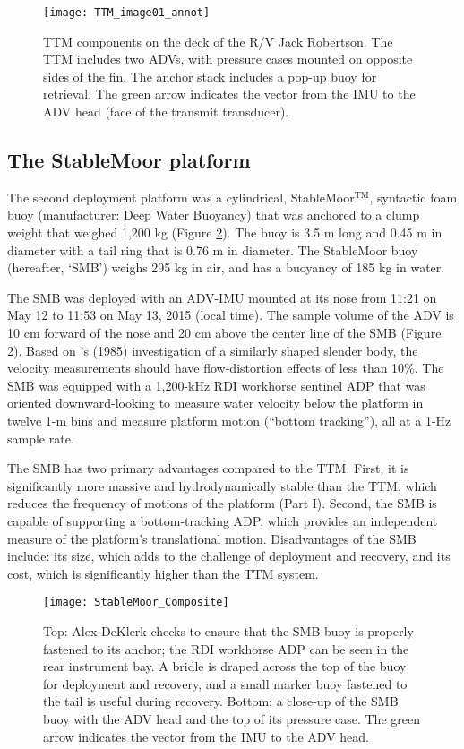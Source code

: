 \begin{figure}[t]
  \centering
  \texttt{[image: TTM\_image01\_annot]}
  \caption{TTM components on the deck of the R/V Jack Robertson. The TTM includes two ADVs, with pressure cases mounted on opposite sides of the fin. The anchor stack includes a pop-up buoy for retrieval. The green arrow indicates the vector from the IMU to the ADV head (face of the transmit transducer). }
  \label{fig:ttm:photo}
\end{figure}

\subsection{The StableMoor platform}

The second deployment platform was a cylindrical, StableMoor$^\mathrm{TM}$, syntactic foam buoy (manufacturer: Deep Water Buoyancy) that was anchored to a clump weight that weighed 1,200 kg (Figure \ref{fig:SM}). The buoy is 3.5 m long and 0.45 m in diameter with a tail ring that is 0.76 m in diameter. The StableMoor buoy (hereafter, `SMB') weighs 295 kg in air, and has a buoyancy of 185 kg in water.

The SMB was deployed with an ADV-IMU mounted at its nose from 11:21 on May 12 to 11:53 on May 13, 2015 (local time). The sample volume of the ADV is 10 cm forward of the nose and 20 cm above the center line of the SMB (Figure \ref{fig:SM}). Based on \citeauthor{Wyngaard++1985}'s (1985) investigation of a similarly shaped slender body, the velocity measurements should have flow-distortion effects of less than 10\%. The SMB was equipped with a 1,200-kHz RDI workhorse sentinel ADP that was oriented downward-looking to measure water velocity below the platform in twelve 1-m bins and measure platform motion (``bottom tracking''), all at a 1-Hz sample rate. 

The SMB has two primary advantages compared to the TTM. First, it is significantly more massive and hydrodynamically stable than the TTM, which reduces the frequency of motions of the platform (Part I). Second, the SMB is capable of supporting a bottom-tracking ADP, which provides an independent measure of the platform's translational motion. Disadvantages of the SMB include: its size, which adds to the challenge of deployment and recovery, and its cost, which is significantly higher than the TTM system.

\begin{figure}[t]
  \centering
  \texttt{[image: StableMoor\_Composite]}
  \caption{Top: Alex DeKlerk checks to ensure that the SMB buoy is properly fastened to its anchor; the RDI workhorse ADP can be seen in the rear instrument bay. A bridle is draped across the top of the buoy for deployment and recovery, and a small marker buoy fastened to the tail is useful during recovery.  Bottom: a close-up of the SMB buoy with the ADV head and the top of its pressure case. The green arrow indicates the vector from the IMU to the ADV head. 
}
  \label{fig:SM}
\end{figure}


